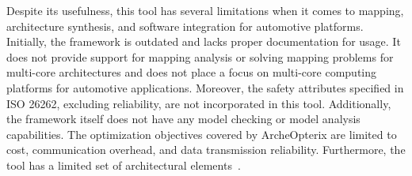 
Despite its usefulness, this tool has several limitations when it comes to mapping, architecture synthesis, and software integration for automotive platforms.
Initially, the framework is outdated and lacks proper documentation for usage. It does not provide support for mapping analysis or solving mapping problems for multi-core architectures and does not place a focus on multi-core computing platforms for automotive applications.
Moreover, the safety attributes specified in ISO 26262, excluding reliability, are not incorporated in this tool. Additionally, the framework itself does not have any model checking or model analysis capabilities. The optimization objectives covered by ArcheOpterix are limited to cost, communication overhead, and data transmission reliability. Furthermore, the tool has a limited set of architectural elements~\cite{askaripoor2022architecture}.





